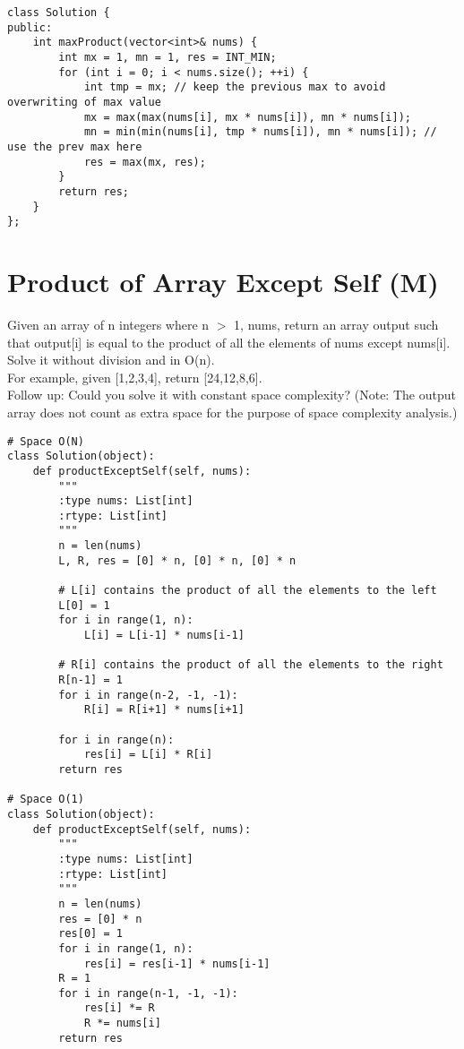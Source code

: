 \begin{lstlisting}
class Solution {
public:
    int maxProduct(vector<int>& nums) {
        int mx = 1, mn = 1, res = INT_MIN;
        for (int i = 0; i < nums.size(); ++i) {
            int tmp = mx; // keep the previous max to avoid overwriting of max value
            mx = max(max(nums[i], mx * nums[i]), mn * nums[i]);
            mn = min(min(nums[i], tmp * nums[i]), mn * nums[i]); // use the prev max here
            res = max(mx, res);
        }
        return res;
    }
};
\end{lstlisting}


\section{Product of Array Except Self (M)}
Given an array of n integers where n $>$ 1, nums, return an array output such that output[i] is equal to the product of all the elements of nums except nums[i]. Solve it without division and in O(n). \\

For example, given [1,2,3,4], return [24,12,8,6].\\

Follow up: Could you solve it with constant space complexity? (Note: The output array does not count as extra space for the purpose of space complexity analysis.)\\

\begin{lstlisting}
# Space O(N)
class Solution(object):
    def productExceptSelf(self, nums):
        """
        :type nums: List[int]
        :rtype: List[int]
        """
        n = len(nums)
        L, R, res = [0] * n, [0] * n, [0] * n
        
        # L[i] contains the product of all the elements to the left
        L[0] = 1
        for i in range(1, n):
            L[i] = L[i-1] * nums[i-1]
            
        # R[i] contains the product of all the elements to the right
        R[n-1] = 1
        for i in range(n-2, -1, -1):
            R[i] = R[i+1] * nums[i+1]
            
        for i in range(n):
            res[i] = L[i] * R[i]
        return res

# Space O(1)
class Solution(object):
    def productExceptSelf(self, nums):
        """
        :type nums: List[int]
        :rtype: List[int]
        """
        n = len(nums)
        res = [0] * n
        res[0] = 1
        for i in range(1, n):
            res[i] = res[i-1] * nums[i-1]
        R = 1
        for i in range(n-1, -1, -1):
            res[i] *= R
            R *= nums[i]
        return res
\end{lstlisting}

